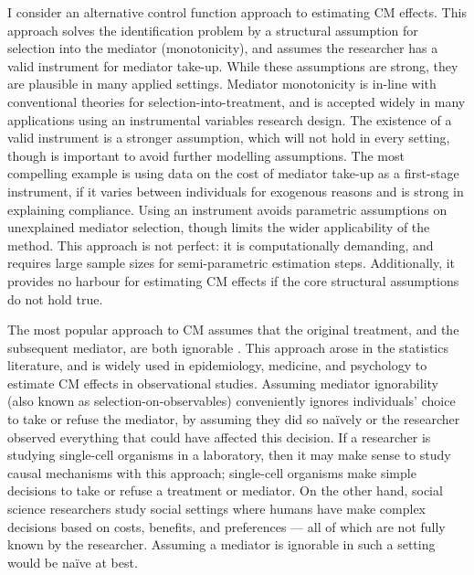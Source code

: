 I consider an alternative control function approach to estimating CM effects.
This approach solves the identification problem by a structural assumption for selection into the mediator (monotonicity), and assumes the researcher has a valid instrument for mediator take-up.
While these assumptions are strong, they are plausible in many applied settings.
Mediator monotonicity is in-line with conventional theories for selection-into-treatment, and is accepted widely in many applications using an instrumental variables research design.
The existence of a valid instrument is a stronger assumption, which will not hold in every setting, though is important to avoid further modelling assumptions. %
The most compelling example is using data on the cost of mediator take-up as a first-stage instrument, if it varies between individuals for exogenous reasons and is strong in explaining compliance.
Using an instrument avoids parametric assumptions on unexplained mediator selection, though limits the wider applicability of the method.
This approach is not perfect: it is computationally demanding, and requires large sample sizes for semi-parametric estimation steps.
Additionally, it provides no harbour for estimating CM effects if the core structural assumptions do not hold true.

The most popular approach to CM assumes that the original treatment, and the subsequent mediator, are both ignorable \citep{imai2010identification}.
This approach arose in the statistics literature, and is widely used in epidemiology, medicine, and psychology to estimate CM effects in observational studies.
Assuming mediator ignorability (also known as selection-on-observables) conveniently ignores individuals' choice to take or refuse the mediator, by assuming they did so na\"ively or the researcher observed everything that could have affected this decision.
If a researcher is studying single-cell organisms in a laboratory, then it may make sense to study causal mechanisms with this approach; single-cell organisms make simple decisions to take or refuse a treatment or mediator.
On the other hand, social science researchers study social settings where humans have make complex decisions based on costs, benefits, and preferences --- all of which are not fully known by the researcher.
Assuming a mediator is ignorable in such a setting would be na\"ive at best.

